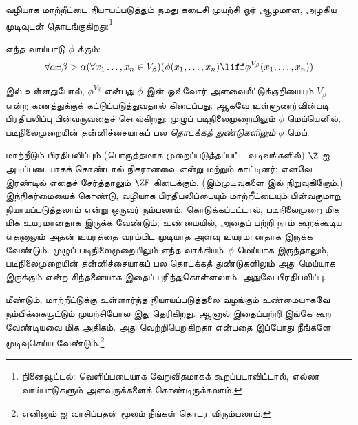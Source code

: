 \documentclass[../../../include/open-logic-section]{subfiles}
\begin{document}

\stagesinex{} வழியாக மாற்றீட்டை நியாயப்படுத்தும் நமது கடைசி முயற்சி ஓர்
ஆழமான, அழகிய முடிவுடன் தொடங்குகிறது:\footnote{நினைவூட்டல்: வெளிப்படையாக
வேறுவிதமாகக் கூறப்படாவிட்டால், எல்லா வாய்பாடுகளும் அளவுருக்களைக்
கொண்டிருக்கலாம்.}
\begin{thm}[பிரதிபலிப்புத் திட்டம்]
எந்த வாய்பாடு $\phi$ க்கும்:
\[
\forall \alpha \exists \beta > \alpha (\forall x_1 \ldots, x_n \in
V_\beta)(\phi(x_1, \ldots, x_n) \liff \phi^{V_\beta}(x_1, \ldots, x_n))
\]
\end{thm}
\noindent
{} இல் உள்ளதுபோல்,
$\phi^{V_\beta}$ என்பது $\phi$ இன் ஒவ்வோர் அளவையீட்டுக்குறியையும்
$V_\beta$ என்ற கணத்துக்குக் கட்டுப்படுத்துவதால் கிடைப்பது. ஆகவே
உள்ளுணர்வின்படி பிரதிபலிப்பு பின்வருவதைச் சொல்கிறது: முழுப்
படிநிலைமுறையிலும் $\phi$ மெய்யெனில், படிநிலைமுறையின் தன்னிச்சையாகப் பல
\emph{தொடக்கத் துண்டுகளிலும்} $\phi$ மெய்.

மாற்றீடும் பிரதிபலிப்பும் (பொருத்தமாக முறைப்படுத்தப்பட்ட வடிவங்களில்)
$\Z$ ஐ அடிப்படையாகக் கொண்டால் நிகரானவை என்று \citet{Montague1961} மற்றும்
\citet{Levy1960} காட்டினர்; எனவே இரண்டில் எதைச் சேர்த்தாலும் $\ZF$
கிடைக்கும். (இம்முடிவுகளை  இல்
நிறுவுகிறோம்.) இந்நிகர்மையைக் கொண்டு, \stagesinex{} வழியாக பிரதிபலிப்பையும்
மாற்றீட்டையும் பின்வருமாறு நியாயப்படுத்தலாம் என்று ஒருவர் நம்பலாம்:
\stagesinex{} கொடுக்கப்பட்டால், படிநிலைமுறை மிக மிக உயரமானதாக இருக்க
வேண்டும்; உண்மையில், அதைப் பற்றி நாம் கூறக்கூடிய எதனாலும் அதன் உயரத்தை
வரம்பிட முடியாத அளவு உயரமானதாக இருக்க வேண்டும். முழுப் படிநிலைமுறையிலும்
எந்த வாக்கியம்~$\phi$ மெய்யாக இருந்தாலும், படிநிலைமுறையின் தன்னிச்சையாகப்
பல தொடக்கத் துண்டுகளிலும் அது மெய்யாக இருக்கும் என்ற சிந்தனையாக இதைப்
புரிந்துகொள்ளலாம். அதுவே பிரதிபலிப்பு.

மீண்டும், மாற்றீட்டுக்கு உள்ளார்ந்த நியாயப்படுத்தலை வழங்கும் உண்மையாகவே
நம்பிக்கையூட்டும் முயற்சிபோல இது தெரிகிறது. ஆனால் இதைப்பற்றி இங்கே கூற
வேண்டியவை மிக அதிகம். அது வெற்றிபெறுகிறதா என்பதை இப்போது நீங்களே
முடிவுசெய்ய வேண்டும்.\footnote{எனினும் \citet[95--100]{Incurvati2020} ஐ
வாசிப்பதன் மூலம் நீங்கள் தொடர விரும்பலாம்.}
\end{document}
